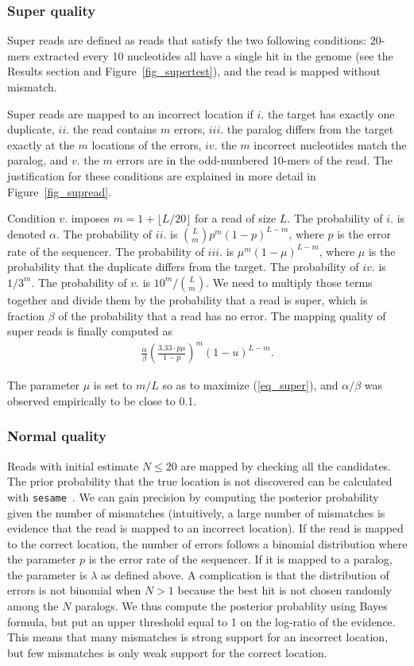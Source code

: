 \documentclass[a4,center,fleqn]{NAR}
\begin{document}
\subsubsection{Super quality} Super reads are defined as reads that
satisfy the two following conditions: 20-mers extracted every 10
nucleotides all have a single hit in the genome (see the Results section
and Figure~\ref{fig_supertest}), and the read is mapped without mismatch.

Super reads are mapped to an incorrect location if $i.$ the target has
exactly one duplicate, $ii.$ the read contains $m$ errors, $iii.$ the
paralog differs from the target exactly at the $m$ locations of the
errors, $iv.$ the $m$ incorrect nucleotides match the paralog, and $v.$
the $m$ errors are in the odd-numbered 10-mers of the read. The
justification for these conditions are explained in more detail in
Figure~\ref{fig_supread}.

Condition $v.$ imposes $m = 1 + \lfloor L/20 \rfloor$ for a read of size
$L$. The probability of $i.$ is denoted $\alpha$. The probability of $ii.$
is ${L \choose m}p^m(1-p)^{L-m}$, where $p$ is the error rate of the
sequencer. The probability of $iii.$ is $\mu^m(1-\mu)^{L-m}$, where $\mu$
is the probability that the duplicate differs from the target. The
probability of $iv.$ is $1/3^m$. The probability of $v.$ is $10^m/{L
\choose m}$. We need to multiply those terms together and divide them by
the probability that a read is super, which is fraction $\beta$ of the
probability that a read has no error. The mapping quality of super reads
is finally computed as
\begin{align}
\label{eq_super}
\frac{\alpha}{\beta} \left( \frac{3.33 \cdot p\mu}{1-p}
\right)^m (1-u)^{L-m}.
\end{align}

The parameter $\mu$ is set to $m/L$ so as to maximize (\ref{eq_super}),
and $\alpha/\beta$ was observed empirically to be close to 0.1.


\subsubsection{Normal quality} Reads with initial estimate $N \leq 20$ are
mapped by checking all the candidates. The prior probability that the true
location is not discovered can be calculated with
\texttt{sesame}~\cite{Filion619155}. We can gain precision by computing the
posterior probability given the number of mismatches (intuitively, a large
number of mismatches is evidence that the read is mapped to an incorrect
location). If the read is mapped to the correct location, the number of
errors follows a binomial distribution where the parameter $p$ is the
error rate of the sequencer. If it is mapped to a paralog, the parameter
is $\lambda$ as defined above. A complication is that the distribution of
errors is not binomial when $N > 1$ because the best hit is not chosen
randomly among the $N$ paralogs. We thus compute the posterior probablity
using Bayes formula, but put an upper threshold equal to 1 on the
log-ratio of the evidence. This means that many mismatches is strong
support for an incorrect location, but few mismatches is only weak support
for the correct location.
\end{document}
